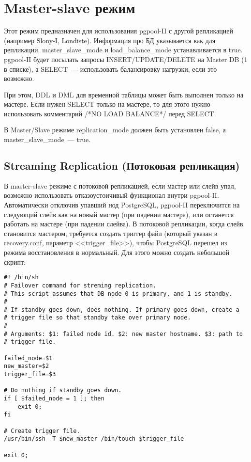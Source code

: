 \section{Master-slave режим}
Этот режим предназначен для использования pgpool-II с другой репликацией (например Slony-I, Londiste).
Информация про БД указывается как для репликации. master\_slave\_mode и load\_balance\_mode устанавливается в true.
pgpool-II будет посылать запросы INSERT/UPDATE/DELETE на Master DB (1 в списке), а SELECT~--- использовать балансировку
нагрузки, если это возможно.

При этом, DDL и DML для временной таблицы может быть выполнен только на мастере. Если нужен SELECT только на мастере, то для этого
нужно использовать комментарий /*NO LOAD BALANCE*/ перед SELECT.

В Master/Slave режиме replication\_mode должен быть установлен false, а master\_slave\_mode~--- true.

\subsection{Streaming Replication (Потоковая репликация)}
В master-slave режиме с потоковой репликацией, если мастер или слейв упал, возможно использовать
отказоустоичивый функционал внутри pgpool-II. Автоматически отключив упавший нод PostgreSQL, pgpool-II переключится на следующий
слейв как на новый мастер (при падении мастера), или останется работать на мастере (при падении слейва).
В потоковой репликации, когда слейв становится мастером, требуется создать триггер файл
(который указан в recovery.conf, параметр <<trigger\_file>>), чтобы PostgreSQL перешел из режима
восстановления в нормальный. Для этого можно создать небольшой скрипт:
\begin{lstlisting}[label=lst:pgpool40,caption=Скрипт выполняется при падении нода PostgreSQL]
#! /bin/sh
# Failover command for streming replication.
# This script assumes that DB node 0 is primary, and 1 is standby.
#
# If standby goes down, does nothing. If primary goes down, create a
# trigger file so that standby take over primary node.
#
# Arguments: $1: failed node id. $2: new master hostname. $3: path to
# trigger file.

failed_node=$1
new_master=$2
trigger_file=$3

# Do nothing if standby goes down.
if [ $failed_node = 1 ]; then
	exit 0;
fi

# Create trigger file.
/usr/bin/ssh -T $new_master /bin/touch $trigger_file

exit 0;
\end{lstlisting}

